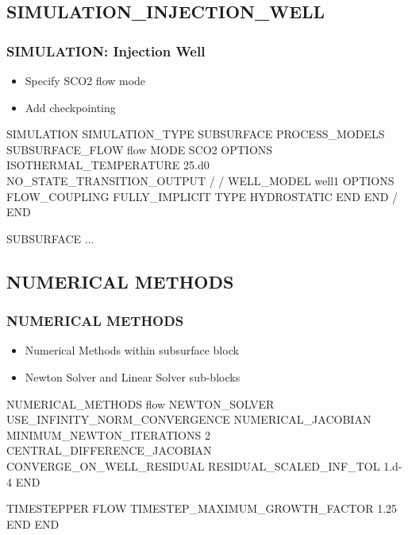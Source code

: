 \documentclass{beamer}
\begin{document}
\subsection{SIMULATION\_INJECTION\_WELL}

\begin{frame}\frametitle{SIMULATION: Injection Well}

\begin{itemize}
\item Specify SCO2 flow mode
\item Add checkpointing
\end{itemize}


\begin{semiverbatim}
SIMULATION
  SIMULATION_TYPE SUBSURFACE
  PROCESS_MODELS
    SUBSURFACE_FLOW flow
      MODE SCO2
      OPTIONS
        ISOTHERMAL_TEMPERATURE 25.d0
        NO_STATE_TRANSITION_OUTPUT
      /
    /
\newpage
    WELL_MODEL well1
      OPTIONS
        FLOW_COUPLING FULLY_IMPLICIT
        TYPE HYDROSTATIC
      END
    END
  /
END

SUBSURFACE
...

\end{semiverbatim}

\end{frame}

\subsection{NUMERICAL METHODS}
\begin{frame}[fragile]\frametitle{NUMERICAL METHODS}

\begin{itemize}
  \item Numerical Methods within subsurface block
  \item Newton Solver and Linear Solver sub-blocks
\end{itemize}

\begin{semiverbatim}
NUMERICAL_METHODS flow
  NEWTON_SOLVER
    USE_INFINITY_NORM_CONVERGENCE
    NUMERICAL_JACOBIAN
    MINIMUM_NEWTON_ITERATIONS 2
    CENTRAL_DIFFERENCE_JACOBIAN
    CONVERGE_ON_WELL_RESIDUAL
    RESIDUAL_SCALED_INF_TOL 1.d-4
  END

  TIMESTEPPER FLOW
    TIMESTEP_MAXIMUM_GROWTH_FACTOR 1.25
  END
END

\end{semiverbatim}
\end{frame}
\end{document}
